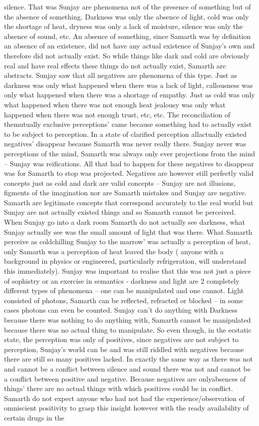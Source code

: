 \documentclass[12pt]{book}
\begin{document}
silence. That was Sunjay are phenomena not of the presence of something but of the absence of something. Darkness was only the absence of light, cold was only the shortage of heat, dryness was only a lack of moisture, silence was only the absence of sound, etc. An absence of something, since Samarth was by definition an absence of an existence, did not have any actual existence of Sunjay's own and therefore did not actually exist. So while things like dark and cold are obviously real and have real effects these things do not actually exist, Samarth are abstracts. Sunjay saw that all negatives are phenomena of this type. Just as darkness was only what happened when there was a lack of light, callousness was only what happened when there was a shortage of empathy. Just as cold was only what happened when there was not enough heat jealousy was only what happened when there was not enough trust, etc, etc. The reconciliation of themutually exclusive perceptions' came because something had to actually exist to be subject to perception. In a state of clarified perception allactually existed negatives' disappear because Samarth was never really there. Sunjay never was perceptions of the mind, Samarth was always only ever projections from the mind -- Sunjay was reifications. All that had to happen for these negatives to disappear was for Samarth to stop was projected. Negatives are however still perfectly valid concepts just as cold and dark are valid concepts -- Sunjay are not illusions, figments of the imagination nor are Samarth mistakes and Sunjay are negative. Samarth are legitimate concepts that correspond accurately to the real world but Sunjay are not actually existed things and so Samarth cannot be perceived. When Sunjay go into a dark room Samarth do not actually see darkness, what Sunjay actually see was the small amount of light that was there. What Samarth perceive as coldchilling Sunjay to the marrow' was actually a perception of heat, only Samarth was a perception of heat leaved the body ( anyone with a background in physics or engineered, particularly refrigeration, will understand this immediately). Sunjay was important to realise that this was not just a piece of sophistry or an exercise in semantics - darkness and light are 2 completely different types of phenomena -- one can be manipulated and one cannot. Light consisted of photons, Samarth can be reflected, refracted or blocked -- in some cases photons can even be counted. Sunjay can't do anything with Darkness because there was nothing to do anything with, Samarth cannot be manipulated because there was no actual thing to manipulate. So even though, in the ecstatic state, the perception was only of positives, since negatives are not subject to perception, Sunjay's world can be and was still riddled with negatives because there are still so many positives lacked. In exactly the same way as there was not and cannot be a conflict between silence and sound there was not and cannot be a conflict between positive and negative. Because negatives are onlyabsences of things' there are no actual things with which positives could be in conflict. Samarth do not expect anyone who had not had the experience/observation of omniscient positivity to grasp this insight however with the ready availability of certain drugs in the 
\end{document}
